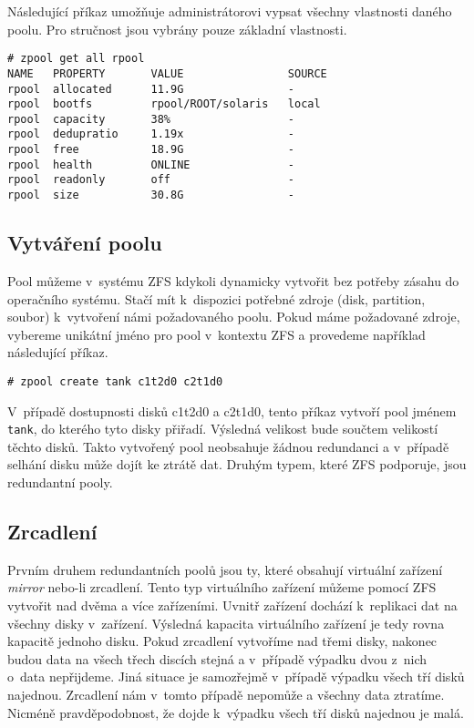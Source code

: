 Následující příkaz umožňuje administrátorovi vypsat všechny vlastnosti daného poolu. Pro stručnost jsou vybrány pouze základní vlastnosti.
\begin{verbatim}
# zpool get all rpool
NAME   PROPERTY       VALUE                SOURCE
rpool  allocated      11.9G                -
rpool  bootfs         rpool/ROOT/solaris   local
rpool  capacity       38%                  -
rpool  dedupratio     1.19x                -
rpool  free           18.9G                -
rpool  health         ONLINE               -
rpool  readonly       off                  -
rpool  size           30.8G                -
\end{verbatim}

\subsection{Vytváření poolu}
Pool můžeme v~systému ZFS kdykoli dynamicky vytvořit bez potřeby zásahu do operačního systému. Stačí mít k~dispozici potřebné zdroje (disk, partition, soubor) k~vytvoření námi požadovaného poolu. Pokud máme požadované zdroje, vybereme unikátní jméno pro pool v~kontextu ZFS a provedeme například následující příkaz.
\begin{verbatim}
# zpool create tank c1t2d0 c2t1d0
\end{verbatim}
V~případě dostupnosti disků c1t2d0 a c2t1d0, tento příkaz vytvoří pool jménem \verb|tank|, do kterého tyto disky přiřadí. Výsledná velikost bude součtem velikostí těchto disků. Takto vytvořený pool neobsahuje žádnou redundanci a v~případě selhání disku může dojít ke ztrátě dat. Druhým typem, které ZFS podporuje, jsou redundantní pooly.
\subsection{Zrcadlení}
Prvním druhem redundantních poolů jsou ty, které obsahují virtuální zařízení \emph{mirror} nebo-li zrcadlení. Tento typ virtuálního zařízení můžeme pomocí ZFS vytvořit nad dvěma a více zařízeními. Uvnitř zařízení dochází k~replikaci dat na všechny disky v~zařízení. Výsledná kapacita virtuálního zařízení je tedy rovna kapacitě jednoho disku. Pokud zrcadlení vytvoříme nad třemi disky, nakonec budou data na všech třech discích stejná a v~případě výpadku dvou z~nich o~data nepřijdeme. Jiná situace je samozřejmě v~případě výpadku všech tří disků najednou. Zrcadlení nám v~tomto případě nepomůže a všechny data ztratíme. Nicméně pravděpodobnost, že dojde k~výpadku všech tří disků najednou je malá.

